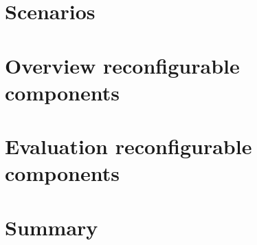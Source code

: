 \newpage
\section{Scenarios}


\newpage
\section{Overview reconfigurable components}


\newpage
\section{Evaluation reconfigurable components}


\newpage
\section{Summary}
